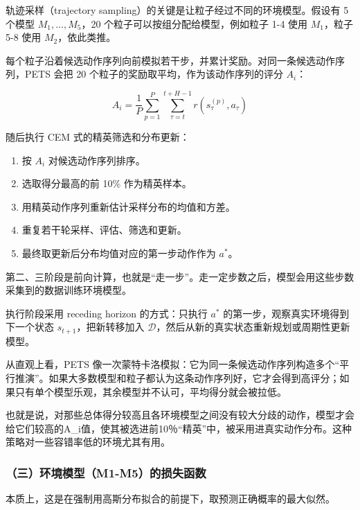 轨迹采样（trajectory sampling）的关键是让粒子经过不同的环境模型。假设有 5 个模型 \(M_1,\ldots,M_5\)，20 个粒子可以按组分配给模型，例如粒子 1-4 使用 \(M_1\)，粒子 5-8 使用 \(M_2\)，依此类推。

每个粒子沿着候选动作序列向前模拟若干步，并累计奖励。对同一条候选动作序列，PETS 会把 20 个粒子的奖励取平均，作为该动作序列的评分 \(A_i\)：

\[
A_i=\frac{1}{P}\sum_{p=1}^{P}\sum_{\tau=t}^{t+H-1}r(s_{\tau}^{(p)},a_{\tau})
\]

随后执行 CEM 式的精英筛选和分布更新：

\begin{enumerate}
\def\labelenumi{\arabic{enumi}.}
\tightlist
\item
  按 \(A_i\) 对候选动作序列排序。
\item
  选取得分最高的前 10\% 作为精英样本。
\item
  用精英动作序列重新估计采样分布的均值和方差。
\item
  重复若干轮采样、评估、筛选和更新。
\item
  最终取更新后分布均值对应的第一步动作作为 \(a^*\)。
\end{enumerate}

第二、三阶段是前向计算，也就是``走一步''。走一定步数之后，模型会用这些步数采集到的数据训练环境模型。

执行阶段采用 receding horizon 的方式：只执行 \(a^*\) 的第一步，观察真实环境得到下一个状态 \(s_{t+1}\)，把新转移加入 \(\mathcal D\)，然后从新的真实状态重新规划或周期性更新模型。

从直观上看，PETS 像一次蒙特卡洛模拟：它为同一条候选动作序列构造多个``平行推演''。如果大多数模型和粒子都认为这条动作序列好，它才会得到高评分；如果只有单个模型乐观，其余模型并不认可，平均得分就会被拉低。

也就是说，对那些总体得分较高且各环境模型之间没有较大分歧的动作，模型才会给它们较高的A\_i值，使其被选进前10％``精英''中，被采用进真实动作分布。这种策略对一些容错率低的环境尤其有用。

\hypertarget{ux4e09ux73afux5883ux6a21ux578bm1-m5ux7684ux635fux5931ux51fdux6570}{%
\subsubsection{（三）环境模型（M1-M5）的损失函数}\label{ux4e09ux73afux5883ux6a21ux578bm1-m5ux7684ux635fux5931ux51fdux6570}}

本质上，这是在强制用高斯分布拟合的前提下，取预测正确概率的最大似然。

